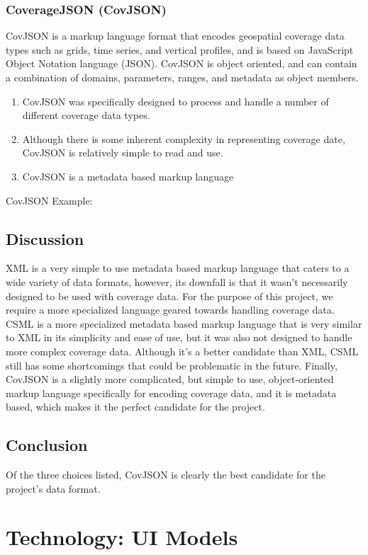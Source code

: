 \documentclass[onecolumn, draftclsnofoot,10pt, compsoc]{IEEEtran}
\begin{document}
\subsubsection{CoverageJSON (CovJSON)}
CovJSON is a markup language format that encodes geospatial coverage data types such as grids, time series, and vertical profiles, and is based on JavaScript Object Notation language (JSON). CovJSON is object oriented, and can contain a combination of domains, parameters, ranges, and metadata as object members.
\begin{enumerate}
\item CovJSON was specifically designed to process and handle a number of different coverage data types.
\item Although there is some inherent complexity in representing coverage date, CovJSON is relatively simple to read and use.
\item CovJSON is a metadata based markup language
\end{enumerate}

CovJSON Example:


\subsection{Discussion}
XML is a very simple to use metadata based markup language that caters to a wide variety of data formats, however, its downfall is that it wasn’t necessarily designed to be used with coverage data. For the purpose of this project, we require a more specialized language geared towards handling coverage data. CSML is a more specialized metadata based markup language that is very similar to XML in its simplicity and ease of use, but it was also not designed to handle more complex coverage data. Although it’s a better candidate than XML, CSML still has some shortcomings that could be problematic in the future. Finally, CovJSON is a slightly more complicated, but simple to use, object-oriented markup language specifically for encoding coverage data, and it is metadata based, which makes it the perfect candidate for the project.

\subsection{Conclusion}
Of the three choices listed, CovJSON is clearly the best candidate for the project’s data format.

\section{Technology: UI Models}
\end{document}
